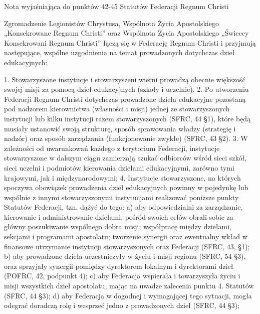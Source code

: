 ﻿\documentclass{book}
\begin{document}
 
 
 
 
 
 
 
 
 
 


  
Nota wyjaśniająca do punktów 42-45 Statutów Federacji Regnum Christi
 
Zgromadzenie Legionistów Chrystusa, Wspólnota Życia Apostolskiego „Konsekrowane Regnum Christi” oraz Wspólnota Życia Apostolskiego „Świeccy Konsekrowani Regnum Christi” łączą się w Federację Regnum Christi i przyjmują następujące, wspólne uzgodnienia na temat prowadzonych dotychczas dzieł edukacyjnych:
 
1.          Stowarzyszone instytucje i stowarzyszeni wierni prowadzą obecnie większość swojej misji za pomocą dzieł edukacyjnych (szkoły i uczelnie).
2.         Po utworzeniu Federacji Regnum Christi dotychczas prowadzone dzieła edukacyjne pozostaną pod nadzorem kierownictwa (własności i misji) jednej ze stowarzyszonych instytucji lub kilku instytucji razem stowarzyszonych (SFRC, 44 \S{}1), które będą musiały ustanowić swoją strukturę, sposób sprawowania władzy (strategię i nadzór) oraz sposób zarządzania (funkcjonowanie zwykłe) (SFRC, 43 \S{}2).
3.         W zależności od uwarunkowań każdego z terytorium Federacji, instytucje stowarzyszone w dalszym ciągu zamierzają szukać odbiorców wśród sieci szkół, sieci uczelni i podmiotów kierowania dziełami edukacyjnymi, zarówno tymi krajowymi, jak i międzynarodowymi;
4.         Instytucje stowarzyszone, na których spoczywa obowiązek prowadzenia dzieł edukacyjnych powinny w pojedynkę lub wspólnie z innymi stowarzyszonymi instytucjami realizować poniższe punkty Statutów Federacji, tzn. dążyć do tego:
a)          aby odpowiedzialni za zarządzanie, kierowanie i administrowanie dziełami, pośród swoich celów obrali sobie za główny poszukiwanie wspólnego dobra misji; współpracę między dziełami, sekcjami i programami apostolatu; tworzenie synergii oraz ewentualny wkład w finansowe utrzymanie instytucji stowarzyszonych oraz Federacji (SFRC, 43, \S{}1);
b)        aby prowadzone dzieła uczestniczyły w życiu i misji regionu (SFRC, 54 \S{}3), oraz sprzyjały synergii pomiędzy dyrektorem lokalnym i dyrektorami dzieł (POFRC, 42, podpunkt 4);
c)         aby Federacja wspierała i towarzyszyła życiu i misji wszystkich dzieł apostolatu, mając na uwadze zalecenia punktu 4. Statutów (SFRC, 44 \S{}3);
d)        aby Federacja w dogodnej i wymagającej tego sytuacji, mogła odegrać doradczą rolę i wesprzeć jedno z prowadzonych dzieł (SFRC, 44 \S{}3);
\end{document}

